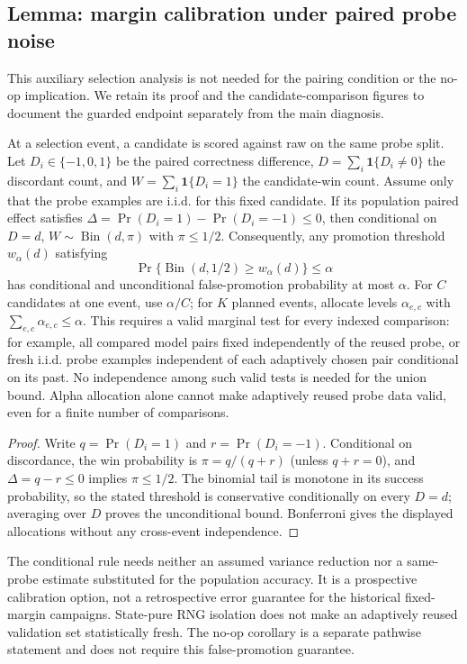 \subsection{Lemma: margin calibration under paired probe noise}

This auxiliary selection analysis is not needed for the pairing condition
or the no-op implication. We retain its proof and the candidate-comparison
figures to document the guarded endpoint separately from the main diagnosis.

\begin{lemma}
\label{lem:margin}
At a selection event, a candidate is scored against raw on the same probe
split. Let $D_i\in\{-1,0,1\}$ be the paired correctness difference,
$D=\sum_i\mathbf 1\{D_i\ne0\}$ the discordant count, and
$W=\sum_i\mathbf 1\{D_i=1\}$ the candidate-win count. Assume only that the
probe examples are i.i.d. for this fixed candidate. If its population paired
effect satisfies $\Delta=\Pr(D_i=1)-\Pr(D_i=-1)\le0$, then conditional on
$D=d$, $W\sim\operatorname{Bin}(d,\pi)$ with $\pi\le1/2$. Consequently, any
promotion threshold $w_\alpha(d)$ satisfying
\[
\Pr\{\operatorname{Bin}(d,1/2)\ge w_\alpha(d)\}\le\alpha
\]
has conditional and unconditional false-promotion probability at most
$\alpha$. For $C$ candidates at one event, use $\alpha/C$; for $K$ planned
events, allocate levels $\alpha_{e,c}$ with $\sum_{e,c}\alpha_{e,c}\le\alpha$.
This requires a valid marginal test for every indexed comparison: for
example, all compared model pairs fixed independently of the reused probe,
or fresh i.i.d. probe examples independent of each adaptively chosen pair
conditional on its past. No independence among such valid tests is needed
for the union bound. Alpha allocation alone cannot make adaptively reused
probe data valid, even for a finite number of comparisons.
\end{lemma}

\begin{proof}
Write $q=\Pr(D_i=1)$ and $r=\Pr(D_i=-1)$. Conditional on discordance,
the win probability is $\pi=q/(q+r)$ (unless $q+r=0$), and
$\Delta=q-r\le0$ implies $\pi\le1/2$. The binomial tail is monotone in its
success probability, so the stated threshold is conservative conditionally
on every $D=d$; averaging over $D$ proves the unconditional bound. Bonferroni
gives the displayed allocations without any cross-event independence.
\end{proof}
\begin{remarkx}
The conditional rule needs neither an assumed variance reduction nor a
same-probe estimate substituted for the population accuracy. It is a prospective calibration
option, not a retrospective error guarantee for the historical fixed-margin
campaigns. State-pure RNG isolation does not make an adaptively reused
validation set statistically fresh. The no-op corollary is a separate
pathwise statement and does not require this false-promotion guarantee.
\end{remarkx}

